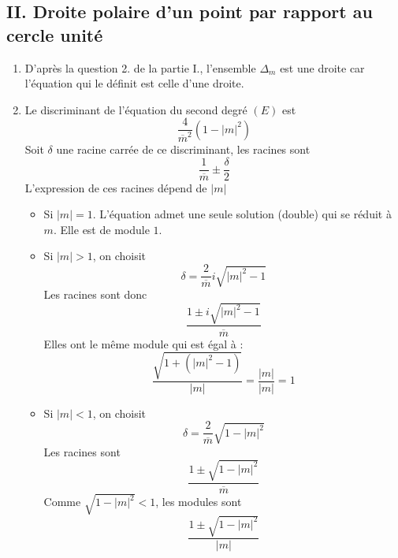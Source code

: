 \subsection*{II. Droite polaire d'un point par rapport au cercle unité}
\begin{enumerate}
 \item D'après la question 2. de la partie I., l'ensemble $\Delta_m$ est une droite car l'équation qui le définit est celle d'une droite. 
 \item Le discriminant de l'équation du second degré $(E)$ est
\begin{displaymath}
 \frac{4}{\overline{m}^2}(1-|m|^2)
\end{displaymath}
Soit $\delta$ une racine carrée de ce discriminant, les racines sont
\begin{displaymath}
 \frac{1}{\overline{m}}\pm\frac{\delta}{2}
\end{displaymath}
L'expression de ces racines dépend de $|m|$
\begin{itemize}
 \item Si $|m|=1$. L'équation admet une seule solution (double) qui se réduit à $m$. Elle est de module $1$.
 \item  Si $|m|>1$, on choisit
\begin{displaymath}
 \delta = \frac{2}{\overline{m}}i\sqrt{|m|^2-1}
\end{displaymath}
Les racines sont donc
\begin{displaymath}
 \frac{1\pm i \sqrt{|m|^2-1}}{\overline{m}}
\end{displaymath}
Elles ont le même module qui est égal à :
\begin{displaymath}
 \frac{\sqrt{1+(|m|^2-1)}}{|m|}= \frac{|m|}{|m|}=1
\end{displaymath}
\item Si $|m|<1$, on choisit
\begin{displaymath}
 \delta = \frac{2}{\overline{m}}\sqrt{1-|m|^2}
\end{displaymath}
Les racines sont
\begin{displaymath}
 \frac{1\pm  \sqrt{1-|m|^2}}{\overline{m}}
\end{displaymath}
Comme $\sqrt{1-|m|^2}<1$, les modules sont
\begin{displaymath}
 \frac{1\pm \sqrt{1-|m|^2}}{|m|}
\end{displaymath}
\end{itemize}


\end{enumerate}
